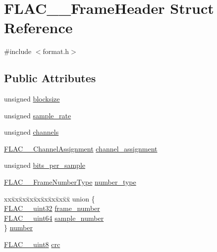 \hypertarget{struct_f_l_a_c_____frame_header}{}\section{F\+L\+A\+C\+\_\+\+\_\+\+Frame\+Header Struct Reference}
\label{struct_f_l_a_c_____frame_header}


{\ttfamily \#include $<$format.\+h$>$}

\subsection*{Public Attributes}
\begin{DoxyCompactItemize}
\item 
unsigned \mbox{\hyperlink{struct_f_l_a_c_____frame_header_ace760def6dcbbde3d9d140e5bfda34b3}{blocksize}}
\item 
unsigned \mbox{\hyperlink{struct_f_l_a_c_____frame_header_acc23daa576f4e75885bf4f2b69cee1be}{sample\+\_\+rate}}
\item 
unsigned \mbox{\hyperlink{struct_f_l_a_c_____frame_header_a5950c6e4f03ad81f4a03c8c6188b9bf5}{channels}}
\item 
\mbox{\hyperlink{group__flac__format_ga79855f8525672e37f299bbe02952ef9c}{F\+L\+A\+C\+\_\+\+\_\+\+Channel\+Assignment}} \mbox{\hyperlink{struct_f_l_a_c_____frame_header_a9a31f752e16da9d690f8d5ff85aed89c}{channel\+\_\+assignment}}
\item 
unsigned \mbox{\hyperlink{struct_f_l_a_c_____frame_header_ae1f4af58cbbb837adf670d12bc4e86f3}{bits\+\_\+per\+\_\+sample}}
\item 
\mbox{\hyperlink{group__flac__format_ga8fe9ebc78386cd2a3d23b7b8e3818e1c}{F\+L\+A\+C\+\_\+\+\_\+\+Frame\+Number\+Type}} \mbox{\hyperlink{struct_f_l_a_c_____frame_header_a7a62ec09e6f3029297179ef65377265f}{number\+\_\+type}}
\item 
\begin{tabbing}
xx\=xx\=xx\=xx\=xx\=xx\=xx\=xx\=xx\=\kill
union \{\\
\>\mbox{\hyperlink{ordinals_8h_a9c4005ea7ef8d564b0cc993cdd0e4e5e}{FLAC\_\_uint32}} \mbox{\hyperlink{struct_f_l_a_c_____frame_header_aa8f183fd8bcb5b73c392ae9ba7da4dbb}{frame\_number}}\\
\>\mbox{\hyperlink{ordinals_8h_aa78c8c70a3eb8a58af7436f278acde8e}{FLAC\_\_uint64}} \mbox{\hyperlink{struct_f_l_a_c_____frame_header_a4bbe555be68bd9fa48a22624233ee9f0}{sample\_number}}\\
\} \mbox{\hyperlink{struct_f_l_a_c_____frame_header_a85ad2b5f95c12338fa312a82b456a918}{number}}\\

\end{tabbing}\item 
\mbox{\hyperlink{ordinals_8h_ac49472999bc6507b4ded92a922168adf}{F\+L\+A\+C\+\_\+\+\_\+uint8}} \mbox{\hyperlink{struct_f_l_a_c_____frame_header_a980438c380697df6f332cb27dc4672c4}{crc}}
\end{DoxyCompactItemize}


